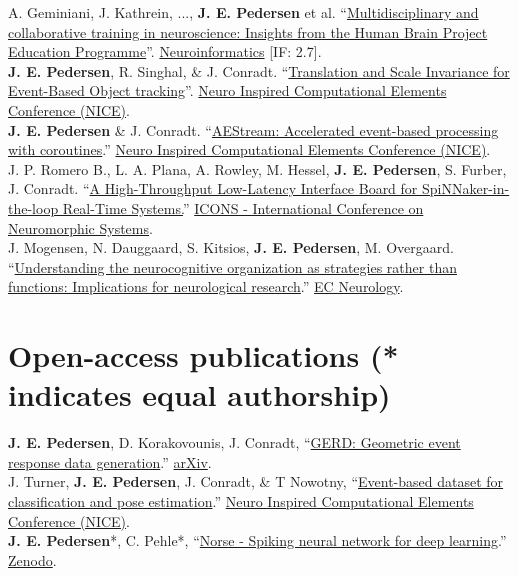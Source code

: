 \documentclass[11pt, a4paper]{article}
\newcommand{\years}[1]{\marginnote{\scriptsize #1}}
\begin{document}
\years{2024}A. Geminiani, J. Kathrein, ..., \textbf{J. E. Pedersen} et al. ``\href{https://link.springer.com/article/10.1007/s12021-024-09682-6}{Multidisciplinary and collaborative training in neuroscience: Insights from the Human Brain Project Education Programme}''. \href{https://link.springer.com/journal/12021}{Neuroinformatics} [IF: 2.7]. \\
\years{2023} \textbf{J. E. Pedersen}, R. Singhal, \& J. Conradt.
``\href{https://dl.acm.org/doi/10.1145/3584954.3584996}{Translation and Scale Invariance for Event-Based Object tracking}''.
\href{https://niceworkshop.org/}{Neuro Inspired Computational Elements Conference (NICE)}. \\
\years{2023} \textbf{J. E. Pedersen} \& J. Conradt.
``\href{https://dl.acm.org/doi/fullHtml/10.1145/3584954.3584997}{AEStream: Accelerated event-based processing with coroutines}.''
\href{https://niceworkshop.org/}{Neuro Inspired Computational Elements Conference (NICE)}. \\
\years{2023} J. P. Romero B., L. A. Plana, A. Rowley, M. Hessel, \textbf{J. E. Pedersen}, S. Furber, J. Conradt.
``\href{https://dl.acm.org/doi/pdf/10.1145/3589737.3605969}{A High-Throughput Low-Latency Interface Board for SpiNNaker-in-the-loop Real-Time Systems.}''
\href{https://icons.ornl.gov/}{ICONS - International Conference on Neuromorphic Systems}. \\
\years{2018} J. Mogensen, N. Dauggaard, S. Kitsios, \textbf{J. E. Pedersen}, M. Overgaard.
``\href{https://researchprofiles.ku.dk/en/publications/understanding-the-neurocognitive-organization-as-strategies-rathe}{Understanding the neurocognitive organization as strategies rather than functions: Implications for neurological research}.''
\href{https://ecronicon.net/ec_neurology}{EC Neurology}.

\section*{Open-access publications {\small (* indicates equal authorship)}}
\years{2025} \textbf{J. E. Pedersen}, D. Korakovounis, J. Conradt, ``\href{https://arxiv.org/abs/2412.03259}{GERD: Geometric event response data generation}.'' \href{https://arxiv.org/abs/2412.03259}{arXiv}. \\
\years{2022} J. Turner, \textbf{J. E. Pedersen}, J. Conradt, \& T Nowotny, ``\href{https://dl.acm.org/doi/10.1145/3517343.3517378}{Event-based dataset for classification and pose estimation}.''
\href{https://niceworkshop.org/}{Neuro Inspired Computational Elements Conference (NICE)}. \\
\years{2020} \textbf{J. E. Pedersen}*, C. Pehle*, ``\href{https://zenodo.org/record/4422025}{Norse - Spiking neural network for deep learning}.''
\href{https://zenodo.org}{Zenodo}.
\end{document}
